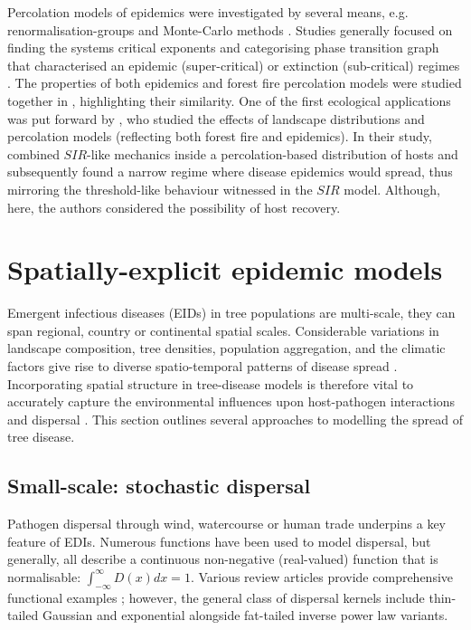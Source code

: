 Percolation models of epidemics were investigated by several means, 
e.g. renormalisation-groups \cite{pub.1060474189} and Monte-Carlo methods \cite{pub.1059069981}. 
Studies generally focused on finding the systems critical exponents and categorising phase
transition graph that characterised an epidemic (super-critical) or extinction (sub-critical) 
regimes \cite{GRASSBERGER1986273}. The properties of both epidemics and forest fire percolation 
models were studied together in \cite{pub.1052857560}, highlighting their similarity.
One of the first ecological applications was put forward by \cite{pub.1031591030}, 
who studied the effects of landscape distributions and percolation models 
(reflecting both forest fire and epidemics). In their study, \cite{pub.1031591030} 
combined $SIR$-like mechanics inside a percolation-based distribution of hosts and subsequently 
found a narrow regime where disease epidemics would spread, thus mirroring the threshold-like 
behaviour witnessed in the $SIR$ model. Although, here, the authors considered the possibility of host recovery.
\newpage

\section{Spatially-explicit epidemic models}
\label{ch2:lit-rev-compartmentalised-models}

Emergent infectious diseases (EIDs) in tree populations are multi-scale,
they can span regional, country or continental spatial scales. Considerable variations in landscape composition,
tree densities, population aggregation, and the climatic factors give rise to diverse spatio-temporal
patterns of disease spread \cite{he2019integrating, suzuki2003spatial}. Incorporating spatial structure
in tree-disease models is therefore vital to accurately capture the environmental influences upon host-pathogen 
interactions and dispersal \cite{liu2007characterizing}. This section outlines several approaches to modelling
the spread of tree disease.

\subsection{Small-scale: stochastic dispersal}
\label{ch2:dispersal}

Pathogen dispersal through wind, watercourse or human trade underpins a key feature of EDIs. 
Numerous functions have been used to model dispersal, but generally, all describe a continuous 
non-negative (real-valued) function that is normalisable: $\int_{-\infty}^{\infty}  D(x)dx = 1$.
Various review articles provide comprehensive functional examples \cite{bullock2017synthesis, nathan2012dispersal, howe1982ecology}; 
however, the general class of dispersal kernels include thin-tailed Gaussian and 
exponential alongside fat-tailed inverse power law variants.

